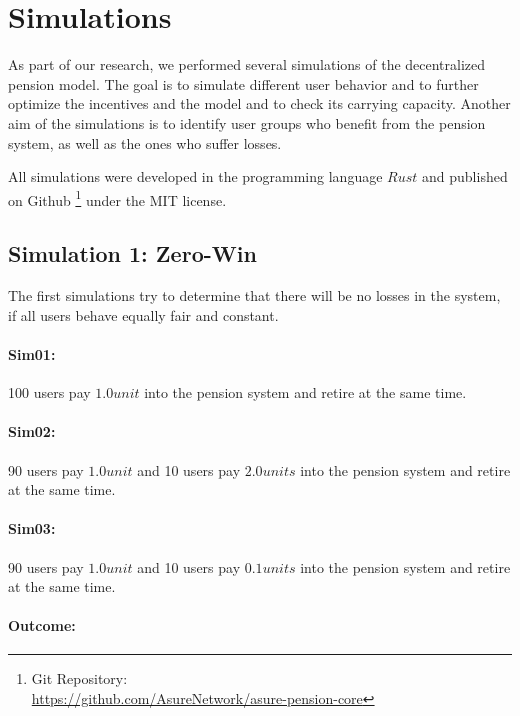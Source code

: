 \section{Simulations}

As part of our research, we performed several simulations of the decentralized pension model. The goal is to simulate different user behavior and to further optimize the incentives and the model and to check its carrying capacity. Another aim of the simulations is to identify user groups who benefit from the pension system, as well as the ones who suffer losses.

All simulations were developed in the programming language $Rust$ and published on Github \footnote{ Git Repository:\\
\url{https://github.com/AsureNetwork/asure-pension-core}} under the MIT license.\\


\subsection{Simulation 1: Zero-Win}

The first simulations try to determine that there will be no losses in the system, if all users behave equally fair and constant.

\paragraph{Sim01:} 100 users pay $1.0 unit$ into the pension system and retire at the same time.

\paragraph{Sim02:} 90 users pay $1.0 unit$ and 10 users pay $2.0 units$ into the pension system and retire at the same time.

\paragraph{Sim03:} 90 users pay $1.0 unit$ and 10 users pay $0.1 units$ into the pension system and retire at the same time.

\paragraph{Outcome:}

\begin{table}[hbt!]
\centering
{}
\end{table}

